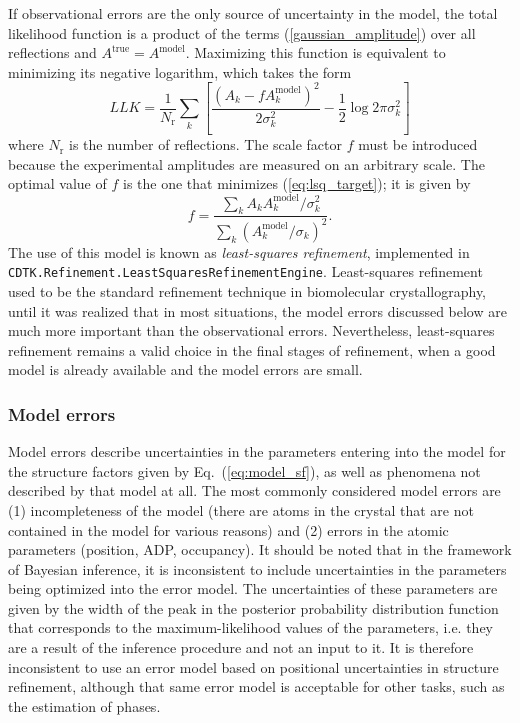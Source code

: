 \documentclass[11pt]{article}
\begin{document}
\begin{sloppy}
If observational errors are the only source of uncertainty in the
model, the total likelihood function is a product of the terms
(\ref{gaussian_amplitude}) over all reflections and $A^{\mbox{true}} =
A^{\mbox{model}}$. Maximizing this function is equivalent to
minimizing its negative logarithm, which takes the form
\begin{equation}
\label{eq:lsq_target}
LLK = \frac{1}{N_{\mbox{r}}}
      \sum_k \left[ \frac{\left( A_k - f A_k^{\mbox{model}}\right)^2}
                         {2 \sigma_k^2}
                    - \frac{1}{2} \log{2\pi\sigma_k^2}
             \right]
\end{equation}
where $N_{\mbox{r}}$ is the number of reflections.
The scale factor $f$ must be introduced because the experimental
amplitudes are measured on an arbitrary scale. The optimal value of
$f$ is the one that minimizes (\ref{eq:lsq_target}); it is given by
\begin{equation}
f = \frac{\sum_k A_k  A_k^{\mbox{model}}/\sigma_k^2}
         {\sum_k \left(A_k^{\mbox{model}}/\sigma_k\right)^2}.
\end{equation}
The use of this model is known as \textit{least-squares refinement},
implemented in \texttt{CDTK.Refinement.LeastSquaresRefinementEngine}.
Least-squares refinement used to be the standard refinement technique
in biomolecular crystallography, until it was realized that in most
situations, the model errors discussed below are much more important
than the observational errors. Nevertheless, least-squares refinement
remains a valid choice in the final stages of refinement, when a good
model is already available and the model errors are small.


\subsubsection{Model errors}

Model errors describe uncertainties in the parameters entering into
the model for the structure factors given by Eq.~(\ref{eq:model_sf}),
as well as phenomena not described by that model at all. The most
commonly considered model errors are (1) incompleteness of the model
(there are atoms in the crystal that are not contained in the model
for various reasons) and (2) errors in the atomic parameters
(position, ADP, occupancy). It should be noted that in the framework
of Bayesian inference, it is inconsistent to include uncertainties in
the parameters being optimized into the error model. The uncertainties
of these parameters are given by the width of the peak in the
posterior probability distribution function that corresponds to the
maximum-likelihood values of the parameters, i.e. they are a result
of the inference procedure and not an input to it. It is therefore
inconsistent to use an error model based on positional uncertainties
in structure refinement, although that same error model is acceptable
for other tasks, such as the estimation of phases.


\end{sloppy}
\end{document}
